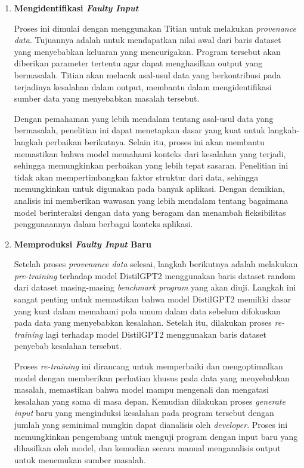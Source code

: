   \begin{enumerate}[topsep=0pt]
    \item \textbf{Mengidentifikasi \emph{Faulty Input}}
    
    Proses ini dimulai dengan menggunakan Titian untuk 
    melakukan \emph{provenance data}. Tujuannya adalah 
    untuk mendapatkan nilai awal dari baris dataset 
    yang menyebabkan keluaran yang mencurigakan. 
    Program tersebut akan diberikan parameter 
    tertentu agar dapat menghasilkan output yang 
    bermasalah. Titian akan melacak asal-usul data 
    yang berkontribusi pada terjadinya kesalahan 
    dalam output, membantu dalam mengidentifikasi 
    sumber data yang menyebabkan masalah tersebut. 
    
    Dengan pemahaman yang lebih mendalam tentang 
    asal-usul data yang bermasalah, penelitian ini 
    dapat menetapkan dasar yang kuat untuk 
    langkah-langkah perbaikan berikutnya. Selain 
    itu, proses ini akan membantu memastikan bahwa 
    model memahami konteks dari kesalahan yang 
    terjadi, sehingga memungkinkan perbaikan yang 
    lebih tepat sasaran. Penelitian ini tidak akan 
    mempertimbangkan faktor struktur dari data, 
    sehingga memungkinkan untuk digunakan pada 
    banyak aplikasi. Dengan demikian, analisis 
    ini memberikan wawasan yang lebih mendalam 
    tentang bagaimana model berinteraksi dengan 
    data yang beragam dan menambah fleksibilitas 
    penggunaannya dalam berbagai konteks aplikasi.

    \item \textbf{Memproduksi \emph{Faulty Input} Baru} 
    
    Setelah proses \emph{provenance data} selesai, 
    langkah berikutnya adalah melakukan 
    \emph{pre-training} terhadap model DistilGPT2 
    menggunakan baris dataset random dari dataset 
    masing-masing \emph{benchmark program} yang 
    akan diuji. Langkah ini sangat penting untuk 
    memastikan bahwa model DistilGPT2 memiliki 
    dasar yang kuat dalam memahami pola umum dalam 
    data sebelum difokuskan pada data yang menyebabkan 
    kesalahan. Setelah itu, dilakukan proses 
    \emph{re-training} lagi terhadap model 
    DistilGPT2 menggunakan baris dataset penyebab 
    kesalahan tersebut. 
    
    Proses \emph{re-training} ini 
    dirancang untuk memperbaiki dan mengoptimalkan 
    model dengan memberikan perhatian khusus pada 
    data yang menyebabkan masalah, memastikan bahwa 
    model mampu mengenali dan mengatasi kesalahan 
    yang sama di masa depan. Kemudian dilakukan 
    proses \emph{generate input} baru yang menginduksi 
    kesalahan pada program tersebut dengan jumlah yang 
    seminimal mungkin dapat dianalisis oleh 
    \emph{developer}. Proses ini memungkinkan 
    pengembang untuk menguji program dengan input 
    baru yang dihasilkan oleh model, dan kemudian 
    secara manual menganalisis output untuk menemukan 
    sumber masalah.


\end{enumerate}
